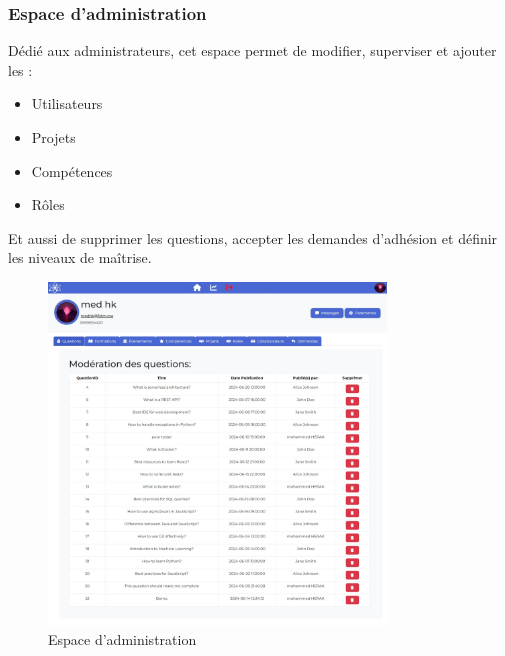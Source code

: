 \documentclass{article}
\begin{document}
                    \subsubsection{Espace d'administration}
                        Dédié aux administrateurs, cet espace permet de modifier, superviser et ajouter les :
                        \begin{itemize}
                            \item Utilisateurs
                            \item Projets
                            \item Compétences
                            \item Rôles
                        \end{itemize}
                        Et aussi de supprimer les questions, accepter les demandes d'adhésion et définir les niveaux de maîtrise.
                        \begin{figure}[h!]
                            \centering
                            \includegraphics[width=0.8\textwidth]{assets/webSite/AdminProfile.jpeg}
                            \caption{Espace d'administration}
                        \end{figure}
                        \FloatBarrier
                        \newpage
\end{document}
